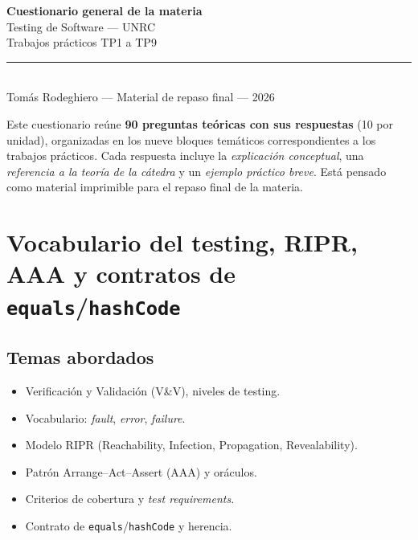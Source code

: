 \documentclass[11pt,a4paper]{article}
\newcounter{preg}
\begin{document}
\begin{center}
  {\Huge\bfseries\color{tpblue} Cuestionario general de la materia}\\[0.4em]
  {\Large\color{tpgray} Testing de Software --- UNRC}\\[0.2em]
  {\large Trabajos prácticos TP1 a TP9}\\[0.6em]
  \rule{0.6\linewidth}{0.5pt}\\[0.4em]
  {\small Tomás Rodeghiero --- Material de repaso final --- 2026}
\end{center}

\vspace{0.8em}

\noindent Este cuestionario reúne \textbf{90 preguntas teóricas con sus respuestas} (10 por unidad), organizadas en los nueve bloques temáticos correspondientes a los trabajos prácticos. Cada respuesta incluye la \emph{explicación conceptual}, una \emph{referencia a la teoría de la cátedra} y un \emph{ejemplo práctico breve}. Está pensado como material imprimible para el repaso final de la materia.

\tableofcontents
\vspace{1em}

\section{Vocabulario del testing, RIPR, AAA y contratos de \texttt{equals}/\texttt{hashCode}}

\subsection*{Temas abordados}
\begin{itemize}[leftmargin=1.4em]
  \item Verificación y Validación (V\&V), niveles de testing.
  \item Vocabulario: \emph{fault}, \emph{error}, \emph{failure}.
  \item Modelo RIPR (Reachability, Infection, Propagation, Revealability).
  \item Patrón Arrange--Act--Assert (AAA) y oráculos.
  \item Criterios de cobertura y \emph{test requirements}.
  \item Contrato de \texttt{equals}/\texttt{hashCode} y herencia.
\end{itemize}
\end{document}
